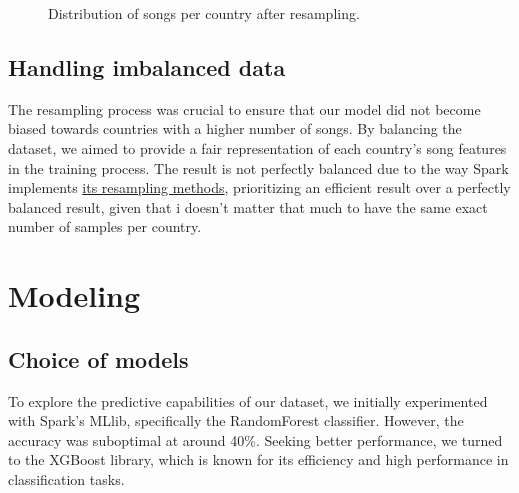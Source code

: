 \documentclass{article}
\begin{document}
\begin{figure}[H]
    \centering
    \noindent
    \caption{Distribution of songs per country after resampling.}
    \label{fig:balanced}
\end{figure}

\subsection{Handling imbalanced data}
The resampling process was crucial to ensure that our model did not become biased towards countries with a higher number of songs. By balancing the dataset, we aimed to provide a fair representation of each country's song features in the training process. The result is not perfectly balanced due to the way Spark implements \href{https://spark.apache.org/docs/latest/api/python/reference/pyspark.sql/api/pyspark.sql.DataFrame.sample.html}{its resampling methods}, prioritizing an efficient result over a perfectly balanced result, given that i doesn't matter that much to have the same exact number of samples per country.

\section{Modeling}

\subsection{Choice of models}
To explore the predictive capabilities of our dataset, we initially experimented with Spark's MLlib, specifically the RandomForest classifier. However, the accuracy was suboptimal at around 40\%. Seeking better performance, we turned to the XGBoost library, which is known for its efficiency and high performance in classification tasks.
\end{document}
